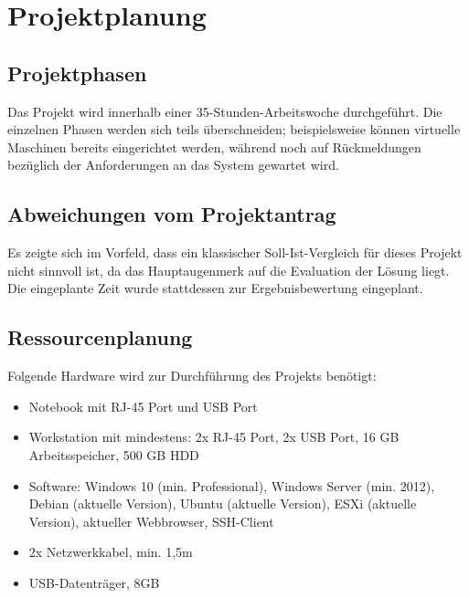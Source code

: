 \section{Projektplanung} 
\label{sec:Projektplanung}

\subsection{Projektphasen}
\label{sec:Projektphasen}
Das Projekt wird innerhalb einer 35-Stunden-Arbeitswoche durchgeführt. Die einzelnen Phasen werden sich teils überschneiden; beispielsweise können virtuelle Maschinen bereits eingerichtet werden, während noch auf Rückmeldungen bezüglich der Anforderungen an das System gewartet wird. 

\subsection{Abweichungen vom Projektantrag}
\label{sec:AbweichungenProjektantrag}
Es zeigte sich im Vorfeld, dass ein klassischer Soll-Ist-Vergleich für dieses Projekt nicht sinnvoll ist, da das Hauptaugenmerk auf die Evaluation der Lösung liegt. Die eingeplante Zeit wurde stattdessen zur Ergebnisbewertung eingeplant.

\subsection{Ressourcenplanung}
\label{sec:Ressourcenplanung}
Folgende Hardware wird zur Durchführung des Projekts benötigt:
\begin{itemize}
  \item Notebook mit RJ-45 Port und USB Port
  \item Workstation mit mindestens: 2x RJ-45 Port, 2x USB Port, 16 GB Arbeitsspeicher, 500 GB HDD
  \item Software: Windows 10 (min. Professional), Windows Server (min. 2012), Debian (aktuelle Version), Ubuntu (aktuelle Version), ESXi (aktuelle Version), aktueller Webbrowser, SSH-Client
  \item 2x Netzwerkkabel, min. 1,5m
  \item USB-Datenträger, 8GB
\end{itemize}